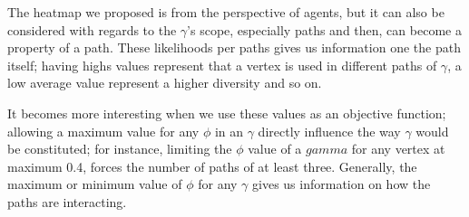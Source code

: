 The heatmap we proposed is from the perspective of agents, but it can also be considered with regards to the \(\gamma\)'s scope, especially paths and then, can become a property of a path. These likelihoods per paths gives us information one the path itself; having highs values represent that a vertex is used in different paths of \(\gamma\), a low average value represent a higher diversity and so on.

It becomes more interesting when we use these values as an objective function; allowing a maximum value for any \(\phi\) in an \(\gamma\) directly influence the way \(\gamma\) would be constituted; for instance, limiting the \(\phi\) value of a \(gamma\) for any vertex at maximum 0.4, forces the number of paths of at least three. Generally, the maximum or minimum value of \(\phi\) for any \(\gamma\) gives us information on how the paths are interacting.







